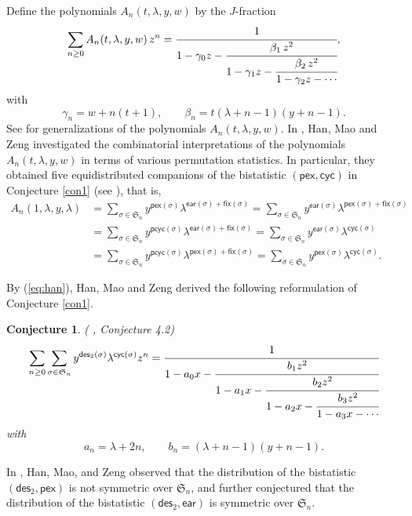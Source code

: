 \documentclass[12pt]{article}
\numberwithin{equation}{section}
\theoremstyle{plain}
\newtheorem{conjecture}[theorem]{Conjecture}
\def\des{\mathsf{des}}
\def\ear{\mathsf{ear}}
\def\cyc{\mathsf{cyc}}
\def\fix{\mathsf{fix}}
\def\pex{\mathsf{pex}}
\def\pcyc{\mathsf{pcyc}}
\begin{document}
	Define the polynomials $A_n(t,\lambda,y,w)$ by the $J$-fraction
	\begin{equation}\label{eq:1.2}
		\sum_{n\ge 0} A_n(t,\lambda,y,w)\, z^n
		=\cfrac{1}{
			1-\gamma_0z-\cfrac{\beta_1\,z^2}{
				1-\gamma_1z-\cfrac{\beta_2\,z^2}{
					1-\gamma_2z-\cdots
				}
			}
		},
	\end{equation}
	with
	\[
	\gamma_n = w + n(t+1),\qquad
	\beta_n = t(\lambda+n-1)(y+n-1).
	\]
	See \cite{sokal2022multivariate} for  generalizations of the polynomials $A_n(t,\lambda,y,w)$. In \cite{han2021equidistributions}, Han, Mao and Zeng investigated the combinatorial interpretations of the polynomials $A_n(t,\lambda,y,w)$ in terms of various permutation statistics.
	In particular, they   obtained five equidistributed companions of the bistatistic $(\pex,\cyc)$ in Conjecture \ref{con1} (see \cite[Theorem 1.7]{han2021equidistributions}), that is, 
	\begin{equation}\label{eq:han}
		\begin{aligned}
			A_n(1,\lambda,y,\lambda)
			&=\sum_{\sigma\in\mathfrak{S}_n} y^{\pex(\sigma)}\lambda^{\ear(\sigma)+\fix(\sigma)}
			=\sum_{\sigma\in\mathfrak{S}_n} y^{\ear(\sigma)}\lambda^{\pex(\sigma)+\fix(\sigma)} \\[4pt]
			&=\sum_{\sigma\in\mathfrak{S}_n} y^{\pcyc(\sigma)}\lambda^{\ear(\sigma)+\fix(\sigma)}
			=\sum_{\sigma\in\mathfrak{S}_n} y^{\ear(\sigma)}\lambda^{\cyc(\sigma)} \\[4pt]
			&=\sum_{\sigma\in\mathfrak{S}_n} y^{\pcyc(\sigma)}\lambda^{\pex(\sigma)+\fix(\sigma)}
			=\sum_{\sigma\in\mathfrak{S}_n} y^{\pex(\sigma)}\lambda^{\cyc(\sigma)}.  
		\end{aligned}
	\end{equation}
	
	
	By (\ref{eq:han}), Han, Mao and Zeng derived the following reformulation of Conjecture \ref{con1}.
	\begin{conjecture}{\upshape ( \cite{han2021equidistributions}, Conjecture 4.2)}
		\label{con:4.2}
		\[
		\sum_{n\geq 0}\sum\limits_{\sigma\in \mathfrak{S}_n}y^{\des_2(\sigma)}\lambda^{\cyc(\sigma)}z^{n}=\cfrac{1}{
			1-a_0x-\cfrac{b_1 z^2}{
				1-a_1x-\cfrac{b_2 z^2}{
					1-a_2x-\cfrac{b_3 z^2}{
						1-a_3x-\cdots
		}}}}
		\]
		with
		\[
		a_n = \lambda + 2n,\qquad
		b_n = (\lambda + n-1 )(y + n-1 ).
		\]
		
	\end{conjecture}
	
	
In \cite{han2021equidistributions}, Han, Mao, and Zeng observed that the distribution of the bistatistic $(\des_2, \pex)$ is not symmetric over $\mathfrak{S}_n$, and further conjectured that the distribution of the bistatistic $(\des_2, \ear)$ is symmetric over $\mathfrak{S}_n$.
	
\end{document}
